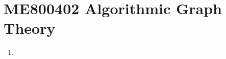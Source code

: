 
\chapter{ME800402 Algorithmic Graph Theory}
\begin{enumerate}[label=Week \arabic*]
	\item 
\end{enumerate}
